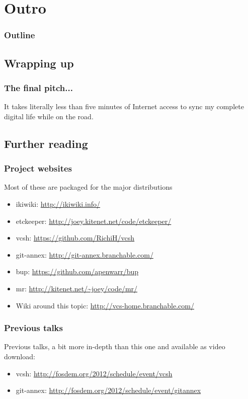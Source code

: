 \documentclass[t]{beamer}
\begin{document}
\section{Outro}

\begin{frame}
	\frametitle{Outline}
	\tableofcontents[currentsection]
\end{frame}

\subsection{Wrapping up}

\begin{frame}
	\frametitle{The final pitch...}
	\vfill
	It takes literally less than five minutes of Internet access to sync my complete digital life while on the road.
	\vfill
\end{frame}

\subsection{Further reading}

\begin{frame}
	\frametitle{Project websites}
	Most of these are packaged for the major distributions
	\begin{itemize}
		\item ikiwiki: \url{http://ikiwiki.info/}
		\item etckeeper: \url{http://joey.kitenet.net/code/etckeeper/}
		\item vcsh: \url{https://github.com/RichiH/vcsh}
		\item git-annex: \url{http://git-annex.branchable.com/}
		\item bup: \url{https://github.com/apenwarr/bup}
		\item mr: \url{http://kitenet.net/~joey/code/mr/}
		\item Wiki around this topic: \url{http://vcs-home.branchable.com/}
	\end{itemize}
\end{frame}

\begin{frame}
	\frametitle{Previous talks}
	Previous talks, a bit more in-depth than this one and available as video download:
	\begin{itemize}
		\item vcsh: \url{http://fosdem.org/2012/schedule/event/vcsh}
		\item git-annex: \url{http://fosdem.org/2012/schedule/event/gitannex}
	\end{itemize}
\end{frame}
\end{document}
